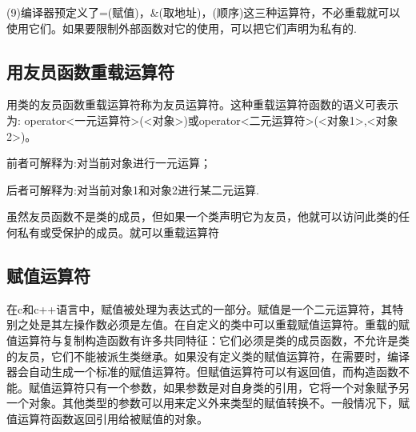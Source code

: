 \documentclass{article}
\begin{document}
(9)编译器预定义了=(赋值)，\&(取地址)，(顺序)这三种运算符，不必重载就可以使用它们。如果要限制外部函数对它的使用，可以把它们声明为私有的.
\subsection{用友员函数重载运算符}
\label{sec-9-3}

用类的友员函数重载运算符称为友员运算符。这种重载运算符函数的语义可表示为:           operator<一元运算符>(<对象>)或operator<二元运算符>(<对象1>,<对象2>)。

前者可解释为:对当前对象进行一元运算；

后者可解释为:对当前对象1和对象2进行某二元运算.

虽然友员函数不是类的成员，但如果一个类声明它为友员，他就可以访问此类的任何私有或受保护的成员。就可以重载运算符 
\subsection{赋值运算符}
\label{sec-9-4}

在c和c++语言中，赋值被处理为表达式的一部分。赋值是一个二元运算符，其特别之处是其左操作数必须是左值。在自定义的类中可以重载赋值运算符。重载的赋值运算符与复制构造函数有许多共同特征：它们必须是类的成员函数，不允许是类的友员，它们不能被派生类继承。如果没有定义类的赋值运算符，在需要时，编译器会自动生成一个标准的赋值运算符。但赋值运算符可以有返回值，而构造函数不能。赋值运算符只有一个参数，如果参数是对自身类的引用，它将一个对象赋予另一个对象。其他类型的参数可以用来定义外来类型的赋值转换不。一般情况下，赋值运算符函数返回引用给被赋值的对象。
\end{document}
